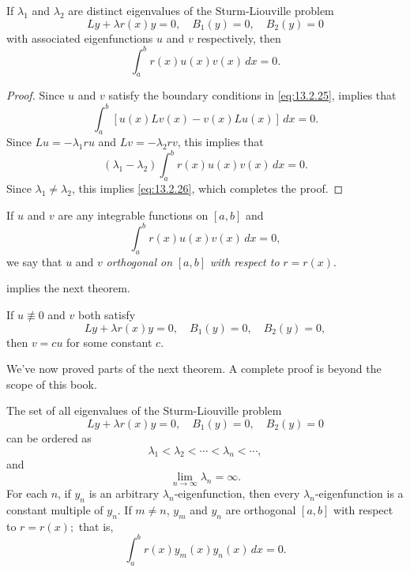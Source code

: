 \begin{theorem}\label{thmtype:13.2.4}
If $\lambda_{1}$ and $\lambda_{2}$ are distinct eigenvalues of the
Sturm-Liouville  problem
\begin{equation} \label{eq:13.2.25}
Ly+\lambda r(x)y=0,\quad B_{1}(y)=0,\quad B_{2}(y)=0
\end{equation}
with associated eigenfunctions $u$ and $v$ respectively, then
\begin{equation} \label{eq:13.2.26}
\int_{a}^{b}r(x)u(x)v(x)\,dx=0.
\end{equation}
\end{theorem}

\begin{proof}
Since $u$ and $v$ satisfy the boundary conditions in \eqref{eq:13.2.25},
 implies that
\[
\int_{a}^{b}[u(x)Lv(x)-v(x)Lu(x)]\,dx=0.
\]
Since $Lu=-\lambda_{1}ru$ and $Lv=-\lambda_{2}rv$, this implies that
\[
(\lambda_{1}-\lambda_{2})\int_{a}^{b}r(x)u(x)v(x)\,dx=0.
\]
Since $\lambda_{1}\ne\lambda_{2}$, this implies \eqref{eq:13.2.26}, which
completes the proof.
\end{proof}

If $u$  and $v$ are any integrable functions on $[a,b]$ and
\[
\int_{a}^{b} r(x)u(x)v(x)\,dx=0,
\]
we say that $u$ and $v$ \emph{orthogonal on} $[a,b]$
\emph{with respect to}
$r=r(x)$.

  implies the next theorem.

\begin{theorem}\label{thmtype:13.2.5}
If $u\not\equiv0$ and $v$ both satisfy
\[
Ly+\lambda r(x)y=0,\quad B_{1}(y)=0,\quad B_{2}(y)=0,
\]
then $v=cu$ for some constant $c$.
\end{theorem}


We've now proved parts of the next theorem. A complete proof is
beyond the scope of this book.


\begin{theorem}\label{thmtype:13.2.6}
The set of all eigenvalues of the Sturm-Liouville problem
\[
Ly+\lambda r(x)y=0,\quad B_{1}(y)=0,\quad B_{2}(y)=0
\]
can be ordered as
\[
\lambda_{1}<\lambda_{2}<\cdots<\lambda_{n}<\cdots,
\]
and
\[
\lim_{n\to\infty} \lambda_{n}=\infty.
\]
For each $n$,  if $y_{n}$ is an arbitrary $\lambda_{n}$-eigenfunction,
then every $\lambda_{n}$-eigenfunction is a constant multiple of $y_{n}$.
If $m\ne n$,   $y_{m}$ and $y_{n}$  are orthogonal $[a,b]$  with
respect to  $r=r(x);$    that is,
\begin{equation} \label{eq:13.2.27}
\int_{a}^{b} r(x)y_{m}(x)y_{n}(x)\,dx=0.
\end{equation}
\end{theorem}


